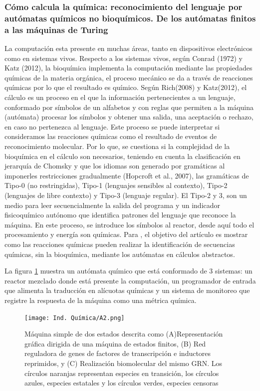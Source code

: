 \documentclass[10pt,conference]{IEEEtran}
\begin{document}
\vspace{2mm}
\subsubsection{\textbf{Cómo calcula la química: reconocimiento del lenguaje por autómatas químicos no bioquímicos. De los autómatas finitos a las máquinas de Turing}}

La computación esta presente en muchas áreas, tanto en dispositivos electrónicos como en sistemas vivos. Respecto a los sistemas vivos, según Conrad (1972) y Katz (2012), la bioquímica implementa la computación mediante las propiedades químicas de la materia orgánica, el proceso mecánico se da a través de reacciones químicas por lo que el resultado es químico. Según Rich(2008) y Katz(2012), el cálculo  es un proceso en el que la información pertenecientes a un lenguaje, conformado por símbolos de un alfabetos y con reglas que permiten a la máquina (autómata) procesar los símbolos y obtener una salida, una aceptación  o rechazo, en caso no pertenezca al lenguaje.
Este proceso se puede interpretar si consideramos las reacciones químicas como el resultado de eventos de reconocimiento molecular. Por lo que, se cuestiona si la complejidad de la bioquímica en el cálculo son necesarios, teniendo en cuenta la clasificación en jerarquía de Chomsky y que los idiomas son generado por gramáticas al imponerles restricciones gradualmente (Hopcroft et al., 2007), las gramáticas de Tipo-0 (no restringidas), Tipo-1 (lenguajes sensibles al contexto), Tipo-2 (lenguajes de libre contexto) y Tipo-3 (lenguaje regular). El Tipo-2 y 3, son un medio para leer secuencialmente la salida del programa y un indicador fisicoquímico autónomo que identifica patrones del lenguaje que reconoce la máquina. En este proceso, se introduce los símbolos al reactor, desde aquí todo el procesamiento y energía son químicas. Para , el objetivo del artículo es mostrar como las reacciones químicas pueden realizar la identificación de secuencias químicas, sin la bioquímica, mediante los autómatas en cálculos abstractos.

La figura \ref{Quimica1.1} muestra un autómata químico que está conformado de 3 sistemas: un reactor mezclado donde está presente la computación, un programador de entrada que alimenta la traducción en alícuotas químicas y un sistema de monitoreo que registre la respuesta de la máquina como una métrica química.

\begin{figure}[H]
 \begin{center}
       \texttt{[image: Ind. Química/A2.png]}
      \caption{Máquina simple de dos estados descrita como (A)Representación gráfica dirigida de una máquina de estados finitos, (B) Red reguladora de genes de factores de transcripción e inductores reprimidos, y (C) Realización biomolecular del mismo GRN. Los círculos naranjas representan especies en transición, los círculos azules, especies estatales y los círculos verdes, especies censoras}
      \label{Quimica1.1} 
      \end{center}
\end{figure}
\end{document}
